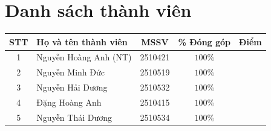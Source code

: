 \section*{Danh sách thành viên}

\vspace{1cm}

\begin{center}
    \renewcommand{\arraystretch}{1.5}
    \begin{tabularx}{\textwidth}{|c|X|c|c|X|}
        \hline
        \textbf{STT} & \textbf{Họ và tên thành viên} & \textbf{MSSV} & \textbf{\% Đóng góp} & \multicolumn{1}{c|}{\textbf{Điểm}} \\ \hline
        1 & Nguyễn Hoàng Anh (NT) & 2510421 & $100\%$ & \\ \hline
        2 & Nguyễn Minh Đức & 2510519 & $100\%$ & \\ \hline
        3 & Nguyễn Hải Dương & 2510532 & $100\%$ & \\ \hline
        4 & Đặng Hoàng Anh & 2510415 & $100\%$ & \\ \hline
        5 & Nguyễn Thái Dương & 2510534 & $100\%$ & \\ \hline
    \end{tabularx}
\end{center}